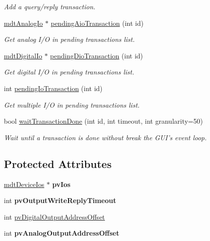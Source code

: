 \begin{DoxyCompactItemize}
\begin{DoxyCompactList}\small\item\em Add a query/reply transaction. \end{DoxyCompactList}\item 
\hyperlink{classmdt_analog_io}{mdtAnalogIo} $\ast$ \hyperlink{classmdt_device_a3c363d61bf4019dbb40a15ac28fd51af}{pendingAioTransaction} (int id)
\begin{DoxyCompactList}\small\item\em Get analog I/O in pending transactions list. \end{DoxyCompactList}\item 
\hyperlink{classmdt_digital_io}{mdtDigitalIo} $\ast$ \hyperlink{classmdt_device_aa7d3959fc291e3e2ae8d712656595dcc}{pendingDioTransaction} (int id)
\begin{DoxyCompactList}\small\item\em Get digital I/O in pending transactions list. \end{DoxyCompactList}\item 
int \hyperlink{classmdt_device_a789ded0f30663dde43ca5d4067273eb7}{pendingIoTransaction} (int id)
\begin{DoxyCompactList}\small\item\em Get multiple I/O in pending transactions list. \end{DoxyCompactList}\item 
bool \hyperlink{classmdt_device_a1df875803a3a0eb7324047d33c139621}{waitTransactionDone} (int id, int timeout, int granularity=50)
\begin{DoxyCompactList}\small\item\em Wait until a transaction is done without break the GUI's event loop. \end{DoxyCompactList}\end{DoxyCompactItemize}
\subsection*{Protected Attributes}
\begin{DoxyCompactItemize}
\item 
\hypertarget{classmdt_device_aa84e01b13f98fc35476a2654f1c8d2b3}{
\hyperlink{classmdt_device_ios}{mdtDeviceIos} $\ast$ {\bfseries pvIos}}
\label{classmdt_device_aa84e01b13f98fc35476a2654f1c8d2b3}

\item 
\hypertarget{classmdt_device_a0b2d5512a223c9cd1e51908c4d9d45a4}{
int {\bfseries pvOutputWriteReplyTimeout}}
\label{classmdt_device_a0b2d5512a223c9cd1e51908c4d9d45a4}

\item 
int \hyperlink{classmdt_device_a7578dfa3df390d20b1bdce1319d45dbc}{pvDigitalOutputAddressOffset}
\item 
\hypertarget{classmdt_device_a50a6824fe8b9ae2a7e7c56b8e0686a76}{
int {\bfseries pvAnalogOutputAddressOffset}}
\label{classmdt_device_a50a6824fe8b9ae2a7e7c56b8e0686a76}

\end{DoxyCompactItemize}


